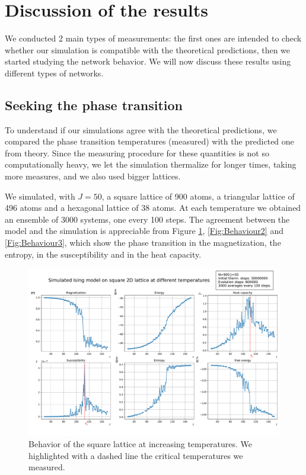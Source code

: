 \section{Discussion of the results}
We conducted 2 main types of measurements: the first ones are intended to check whether our simulation is compatible with the theoretical predictions, then we started studying the network behavior. We will now discuss these results using different types of networks.
\subsection{Seeking the phase transition}
To understand if our simulations agree with the theoretical predictions, we compared the phase transition temperatures (measured) with the predicted one from theory. Since the measuring procedure for these quantities is not so computationally heavy, we let the simulation thermalize for longer times, taking more measures, and we also used bigger lattices.

We simulated, with $J=50$, a square lattice of 900 atoms, a triangular lattice of 496 atoms and a hexagonal lattice of 38 atoms. At each temperature we obtained an ensemble of 3000 systems, one every 100 steps. The agreement between the model and the simulation is appreciable from Figure \ref{Fig:Behaviour1}, \ref{Fig:Behaviour2} and \ref{Fig:Behaviour3}, which show the phase transition in the magnetization, the entropy, in the susceptibility and in the heat capacity.

\begin{figure}[!htb]
    \includegraphics[width=\linewidth]{2d_square_thermal.pdf}
      \caption{Behavior of the square lattice at increasing temperatures. We highlighted with a dashed line the critical temperatures we measured.}\label{Fig:Behaviour1}
\end{figure}

